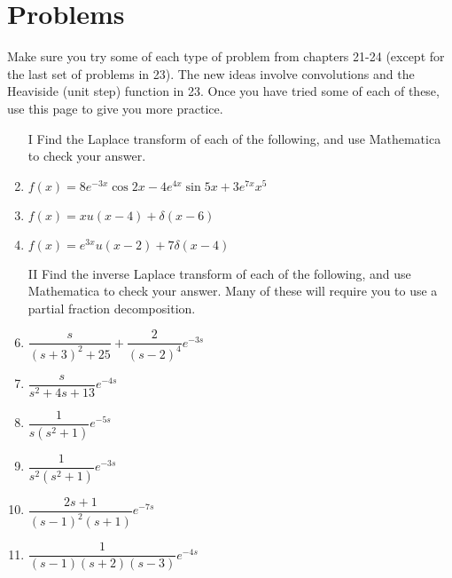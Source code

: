 \section{Problems}
Make sure you try some of each type of problem from chapters 21-24 (except for the last set of problems in 23).  The new ideas involve convolutions and the Heaviside (unit step) function in 23.  Once you have tried some of each of these, use this page to give you more practice.  


\begin{enumerate}
\item[I] Find the Laplace transform of each of the following, and use Mathematica to check your answer.
\item $f(x) = 8e^{-3x}\cos 2x -4e^{4x}\sin 5x+3e^{7x}x^5$
\item $f(x) = xu(x-4)+\delta(x-6)$
\item $f(x) = e^{3x}u(x-2)+7\delta(x-4)$

\item[II] Find the inverse Laplace transform of each of the following, and use Mathematica to check your answer. Many of these will require you to use a partial fraction decomposition.
\item $\dfrac{s}{(s+3)^2+25}+\dfrac{2}{(s-2)^4}e^{-3s}$
\item $\dfrac{s}{s^2+4s+13}e^{-4s}$
\item $\dfrac{1}{s(s^2+1)}e^{-5s}$
\item $\dfrac{1}{s^2(s^2+1)}e^{-3s}$
\item $\dfrac{2s+1}{(s-1)^2(s+1)}e^{-7s}$
\item $\dfrac{1}{(s-1)(s+2)(s-3)}e^{-4s}$


\end{enumerate}
